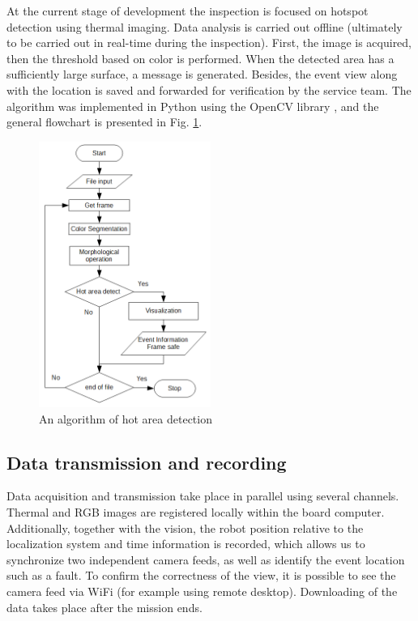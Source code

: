 \documentclass[3p,times,12pt]{elsarticle}
\begin{document}
At the current stage of development the inspection is focused on hotspot detection using thermal imaging. Data analysis is carried out offline (ultimately to be carried out in real-time during the inspection). First, the image is acquired, then the threshold based on color is performed. When the detected area has a sufficiently large surface, a message is generated. Besides, the event view along with the location is saved and forwarded for verification by the service team. The algorithm was implemented in Python using the OpenCV library \cite{opencv}, and the general flowchart is presented in Fig. \ref{fig:alg_hot_detection}.

\begin{figure}[ht!]
	\centering
	\includegraphics[width=0.5\textwidth]{Alg_cam_hot_point_detection.png}
	\caption{An algorithm of hot area detection}
	\label{fig:alg_hot_detection}
\end{figure}



\subsection{Data transmission and recording}

Data acquisition and transmission take place in parallel using several channels. Thermal and RGB images are registered locally within the board computer. Additionally, together with the vision, the robot position relative to the localization system and time information is recorded, which allows us to synchronize two independent camera feeds, as well as identify the event location such as a fault. To confirm the correctness of the view, it is possible to see the camera feed via WiFi (for example using remote desktop). Downloading of the data takes place after the mission ends. 
\end{document}
